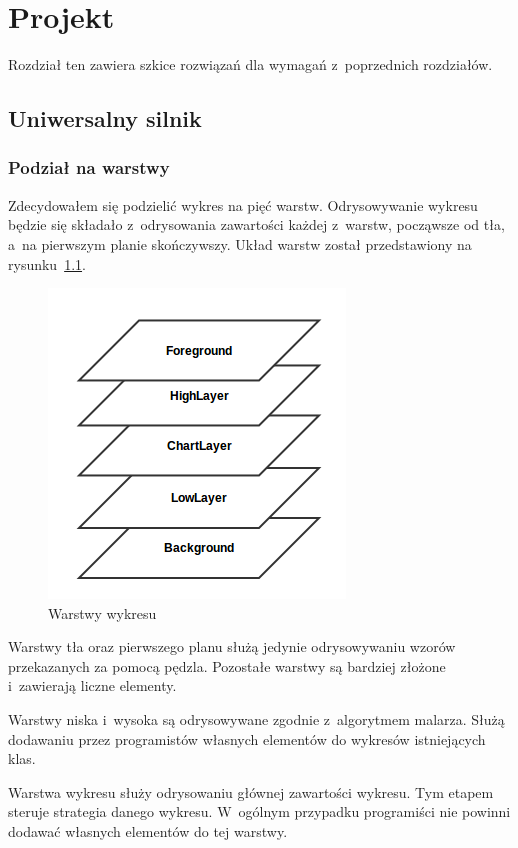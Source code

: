 \chapter{Projekt}
Rozdział ten zawiera szkice rozwiązań dla wymagań z~poprzednich rozdziałów.

\section{Uniwersalny silnik}
\subsection{Podział na warstwy}
Zdecydowałem się podzielić wykres na pięć warstw. Odrysowywanie wykresu będzie się składało z~odrysowania zawartości każdej z~warstw, począwsze od tła, a~na pierwszym planie skończywszy.
Układ warstw został przedstawiony na rysunku~\ref{rys:warstwy}.

\begin{figure}
\centering
\caption{Warstwy wykresu}\label{rys:warstwy}
\includegraphics{img/warstwy.png}
\end{figure}

Warstwy tła oraz pierwszego planu służą jedynie odrysowywaniu wzorów przekazanych za pomocą pędzla. Pozostałe warstwy są bardziej złożone i~zawierają liczne elementy.

Warstwy niska i~wysoka są odrysowywane zgodnie z~algorytmem malarza. Służą dodawaniu przez programistów własnych elementów do wykresów istniejących klas.

Warstwa wykresu służy odrysowaniu głównej zawartości wykresu. Tym etapem steruje strategia danego wykresu. W~ogólnym przypadku programiści nie powinni dodawać własnych elementów do tej warstwy.

